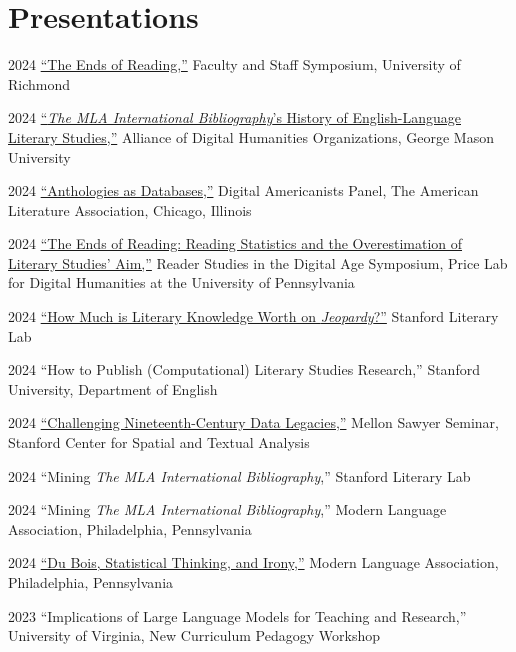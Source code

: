 \documentclass[12pt,letterpaper]{report}
\begin{document}
\section*{Presentations}

\begin{tablist}
	\item[2024] \tab{}\href{https://fredner.org/reading}{\enquote{The Ends of Reading,}} Faculty and Staff Symposium, University of Richmond
	\item[2024] \tab{}\href{https://docs.google.com/presentation/d/1l9RF4TAfG1vhc70sQD6SnQdnvPGKdysiGc0saopwz_U/edit?usp=sharing}{\enquote{\emph{The MLA International Bibliography}'s History of English-Language Literary Studies,}} Alliance of Digital Humanities Organizations, George Mason University
	\item[2024] \tab{}\href{https://docs.google.com/presentation/d/1kxUCWK4iz4En_G63ZDqExkxh6nzd3Qp0PB6DmuwebyU/edit?usp=sharing}{\enquote{Anthologies as Databases,}} Digital Americanists Panel, The American Literature Association, Chicago, Illinois
	\item[2024] \tab{}\href{https://fredner.org/price/}{\enquote{The Ends of Reading: Reading Statistics and the Overestimation of Literary Studies' Aim,}} Reader Studies in the Digital Age Symposium, Price Lab for Digital Humanities at the University of Pennsylvania
	\item[2024] \tab{}\href{https://docs.google.com/presentation/d/1EKy3ISqJIJrCxeOp9XZF2KULLyvgqQUtn-MRDFojC54/edit?usp=sharing}{\enquote{How Much is Literary Knowledge Worth on \emph{Jeopardy}?}} Stanford Literary Lab
	\item[2024] \tab{}\enquote{How to Publish (Computational) Literary Studies Research,} Stanford University, Department of English
	\item[2024] \tab{}\href{https://fredner.org/sawyer/}{\enquote{Challenging Nineteenth-Century Data Legacies,}} Mellon Sawyer Seminar, Stanford Center for Spatial and Textual Analysis
	\item[2024] \tab{}\enquote{Mining \emph{The MLA International Bibliography},} Stanford Literary Lab
	\item[2024] \tab{}\enquote{Mining \emph{The MLA International Bibliography},} Modern Language Association, Philadelphia, Pennsylvania
	\item[2024] \tab{}\href{https://fredner.org/files/mla24.html}{\enquote{Du Bois, Statistical Thinking, and Irony,}} Modern Language Association, Philadelphia, Pennsylvania
	\item[2023] \tab{}\enquote{Implications of Large Language Models for Teaching and Research,} University of Virginia, New Curriculum Pedagogy Workshop

\end{tablist}
\end{document}
